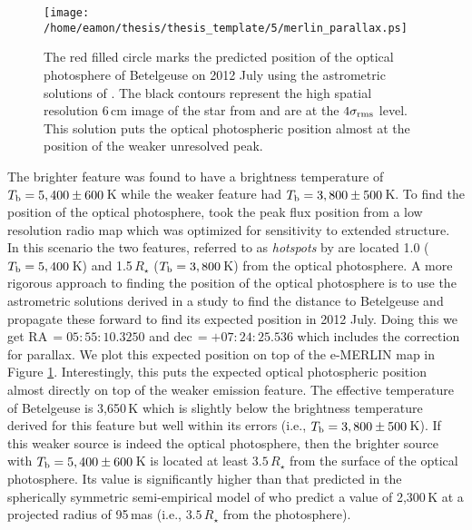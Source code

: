 \begin{figure}[!ht]
\centering 
          \texttt{[image: /home/eamon/thesis/thesis\_template/5/merlin\_parallax.ps]}
\caption[Predicted position of Betelgeuse on 2012 July using the astrometric solutions of \cite{harper_2008}.]{The red filled circle marks the predicted position of the optical photosphere of Betelgeuse on 2012 July using the astrometric solutions of \cite{harper_2001}. The black contours represent the high spatial resolution 6\,cm image of the star from \cite{richards_2013} and are at the $4\sigma _{\rm{rms}}$ level. This solution puts the optical photospheric position almost at the position of the weaker unresolved peak.}
\label{fig:5.14}
\end{figure}

The brighter feature was found to have a brightness temperature of $T_{\rm{b}}=5,400\pm 600$\,K while the weaker feature had $T_{\rm{b}}=3,800\pm 500$\,K. To find the position of the optical photosphere, \cite{richards_2013} took the peak flux position from a low resolution radio map which was optimized for sensitivity to extended structure. In this scenario the two features, referred to as \textit{hotspots} by \cite{richards_2013} are located 1.0 ($T_{\rm{b}}=5,400$\,K) and 1.5\,$R_{\star}$ ($T_{\rm{b}}=3,800$\,K) from the optical photosphere. A more rigorous approach to finding the position of the optical photosphere is to use the astrometric solutions derived in a study to find the distance to Betelgeuse \citep[solution 5 in][]{harper_2008} and propagate these forward to find its expected position in 2012 July. Doing this we get RA\,$=05:55:10.3250$ and dec\,$=+07:24:25.536$ which includes the correction for parallax. We plot this expected position on top of the e-MERLIN map in Figure \ref{fig:5.14}. Interestingly, this puts the expected optical photospheric position almost directly on top of the weaker emission feature. The effective temperature of Betelgeuse is 3,650\,K \citep{levesque_2005} which is slightly below the brightness temperature derived for this feature but well within its errors (i.e., $T_{\rm{b}}=3,800\pm 500$\,K). If this weaker source is indeed the optical photosphere, then the brighter source with $T_{\rm{b}}=5,400\pm 600$\,K is located at least $3.5\,R_{\star}$ from the surface of the optical photosphere. Its value is significantly higher than that predicted in the spherically symmetric semi-empirical model of \cite{harper_2001} who predict a value of 2,300\,K at a projected radius of 95\,mas (i.e., $3.5\,R_{\star}$ from the photosphere).

